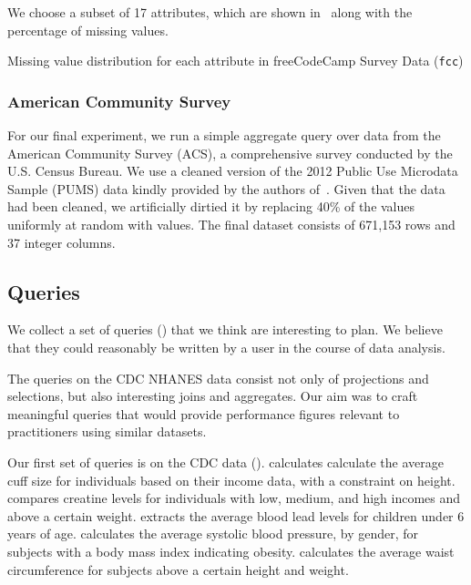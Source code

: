 We choose a subset of 17 attributes, which are shown in~ along
with the percentage of missing values.

\begin{table}
  \centering
  
  \caption{Missing value distribution for each attribute in freeCodeCamp Survey Data (\texttt{fcc})}\label{table:fcc-description} 
\end{table}

\subsubsection{American Community Survey}
For our final experiment, we run a simple aggregate query over data from the American
Community Survey (ACS), a comprehensive survey conducted by the U.S.
Census Bureau. We use a cleaned version of the 2012 Public Use Microdata Sample (PUMS)
data kindly provided by the authors of~\cite{akande2015empirical}. Given that the data had
been cleaned, we artificially dirtied it by replacing 40\% of the values uniformly at random with \nullv{} values.
The final dataset consists of 671,153 rows and 37 integer columns.

\subsection{Queries}
We collect a set of queries () that we think are interesting to plan.
We believe that they could reasonably be written by a user in the course of data analysis.

The queries on the CDC NHANES data consist not only of projections and selections, but also
interesting joins and aggregates. Our aim was to craft meaningful queries that would
provide performance figures relevant to practitioners using similar datasets.

Our first set of queries is on the CDC data ().
 calculates calculate the average cuff size for individuals based on their income data, with a constraint on height.
 compares creatine levels for individuals with low, medium, and high incomes and above a certain weight.
 extracts the average blood lead levels for children under 6 years of age.
 calculates the average systolic blood pressure, by gender, for subjects with a body mass index indicating obesity. 
 calculates the average waist circumference for subjects above a certain height and weight.

